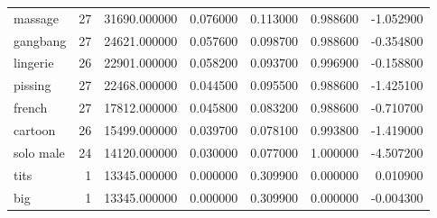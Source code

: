 \begin{tabular}{lrrrrrr}
massage & 27 & 31690.000000 & 0.076000 & 0.113000 & 0.988600 & -1.052900 \\
gangbang & 27 & 24621.000000 & 0.057600 & 0.098700 & 0.988600 & -0.354800 \\
lingerie & 26 & 22901.000000 & 0.058200 & 0.093700 & 0.996900 & -0.158800 \\
pissing & 27 & 22468.000000 & 0.044500 & 0.095500 & 0.988600 & -1.425100 \\
french & 27 & 17812.000000 & 0.045800 & 0.083200 & 0.988600 & -0.710700 \\
cartoon & 26 & 15499.000000 & 0.039700 & 0.078100 & 0.993800 & -1.419000 \\
solo male & 24 & 14120.000000 & 0.030000 & 0.077000 & 1.000000 & -4.507200 \\
tits & 1 & 13345.000000 & 0.000000 & 0.309900 & 0.000000 & 0.010900 \\
big & 1 & 13345.000000 & 0.000000 & 0.309900 & 0.000000 & -0.004300 \\
\bottomrule
\end{tabular}
